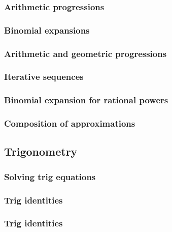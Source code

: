 \documentclass{article}
\begin{document}
\subsubsection{Arithmetic progressions}


\subsubsection{Binomial expansions}


\subsubsection{Arithmetic and geometric progressions}


\subsubsection{Iterative sequences}


\subsubsection{Binomial expansion for rational powers}


\subsubsection{Composition of approximations}



\subsection{Trigonometry}

\subsubsection{Solving trig equations}


\subsubsection{Trig identities}


\subsubsection{Trig identities}

\end{document}
